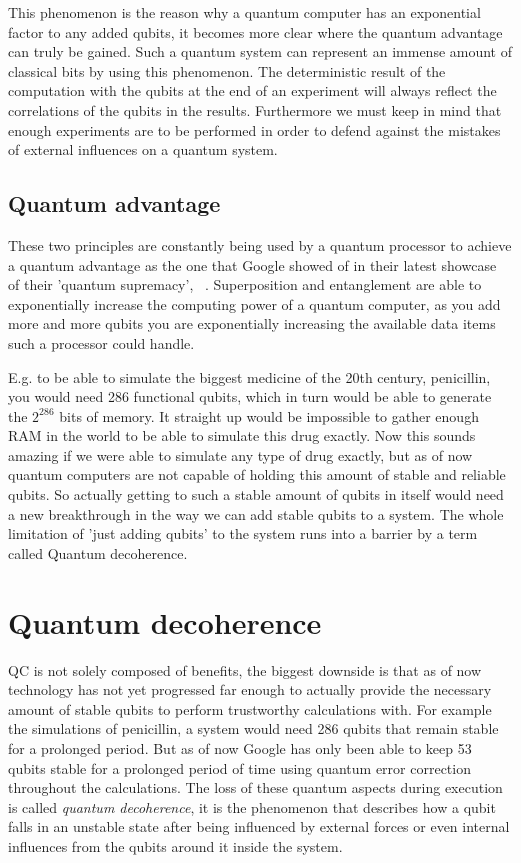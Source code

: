 This phenomenon is the reason why a quantum computer has an exponential factor to any added qubits, it becomes more clear where the quantum advantage can truly be gained. Such a quantum system can represent an immense amount of classical bits by using this phenomenon. The deterministic result of the computation with the qubits at the end of an experiment will always reflect the correlations of the qubits in the results. Furthermore we must keep in mind that enough experiments are to be performed in order to defend against the mistakes of external influences on a quantum system.
~\autocite{fern2016mathematics}

\subsection{Quantum advantage}
These two principles are constantly being used by a quantum processor to achieve a quantum advantage as the one that Google showed of in their latest showcase of their 'quantum supremacy', ~\textcite{Google2019}. Superposition and entanglement are able to exponentially increase the computing power of a quantum computer, as you add more and more qubits you are exponentially increasing the available data items such a processor could handle. 

E.g. to be able to simulate the biggest medicine of the 20th century, penicillin, you would need 286 functional qubits, which in turn would be able to generate the $2^{286}$ bits of memory. It straight up would be impossible to gather enough RAM in the world to be able to simulate this drug exactly. Now this sounds amazing if we were able to simulate any type of drug exactly, but as of now quantum computers are not capable of holding this amount of stable and reliable qubits. So actually getting to such a stable amount of qubits in itself would need a new breakthrough in the way we can add stable qubits to a system. The whole limitation of 'just adding qubits' to the system runs into a barrier by a term called Quantum decoherence.

\section{Quantum decoherence}

QC is not solely composed of benefits, the biggest downside is that as of now technology has not yet progressed far enough to actually provide the necessary amount of stable qubits to perform trustworthy calculations with. For example the simulations of penicillin, a system would need 286 qubits that remain stable for a prolonged period. But as of now  Google has only been able to keep 53 qubits stable for a prolonged period of time using quantum error correction throughout the calculations. The loss of these quantum aspects during execution is called \textit{quantum decoherence}, it is the phenomenon that describes how a qubit falls in an unstable state after being influenced by external forces or even internal influences from the qubits around it inside the system.

